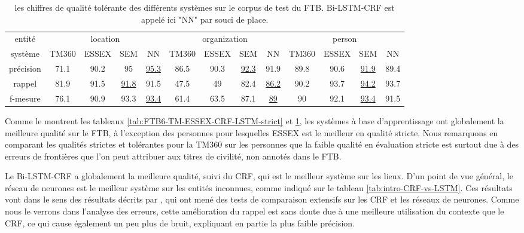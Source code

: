 \documentclass[12pt,a4paper,times,twoside,openright]{report}
\begin{document}
\begin{table}[ht!]
\centering
\scriptsize
\begin{tabular}{|c|cccc|cccc|cccc|}
\hline
entité    & \multicolumn{4}{c|}{location}                        & \multicolumn{4}{c|}{organization}                   & \multicolumn{4}{c|}{person} \\
système   & TM360 &  ESSEX & SEM              & NN               & TM360 & ESSEX & SEM              & NN               & TM360 & ESSEX & SEM              & NN \\
\hline
précision & 71.1  & 90.2   & 95               & \underline{95.3} & 86.5  & 90.3  & \underline{92.3} & 91.9             & 89.8 & 90.6   & \underline{91.9} & 89.4 \\
rappel    & 81.9  & 91.5   & \underline{91.8} & 91.5             & 47.5  & 49    & 82.4             & \underline{86.2} & 90.2 & 93.7   & \underline{94.2} & 93.7 \\
f-mesure  & 76.1  & 90.9   & 93.3             & \underline{93.4} & 61.4  & 63.5  & 87.1             & \underline{89}   & 90   & 92.1   & \underline{93.4} & 91.5 \\
\hline
\end{tabular}
\caption{les chiffres de qualité tolérante des différents systèmes sur le corpus de test du FTB. Bi-LSTM-CRF est appelé ici "NN" par souci de place.}
\label{tab:FTB6-TM-ESSEX-CRF-LSTM-tolerant}
\end{table}

Comme le montrent les tableaux \ref{tab:FTB6-TM-ESSEX-CRF-LSTM-strict} et \ref{tab:FTB6-TM-ESSEX-CRF-LSTM-tolerant}, les systèmes à base d'apprentissage ont globalement la meilleure qualité sur le FTB, à l'exception des personnes pour lesquelles ESSEX est le meilleur en qualité stricte. Nous remarquons en comparant les qualités strictes et tolérantes pour la TM360 sur les personnes que la faible qualité en évaluation stricte est surtout due à des erreurs de frontières que l'on peut attribuer aux titres de civilité, non annotés dans le FTB.

Le Bi-LSTM-CRF a globalement la meilleure qualité, suivi du CRF, qui est le meilleur système sur les lieux. D'un point de vue général, le réseau de neurones est le meilleur système sur les entités inconnues, comme indiqué sur le tableau \ref{tab:intro-CRF-vs-LSTM}. Ces résultats vont dans le sens des résultats décrits par \citet{augenstein2017generalisation}, qui ont mené des tests de comparaison extensifs sur les CRF et les réseaux de neurones. Comme nous le verrons dans l'analyse des erreurs, cette amélioration du rappel est sans doute due à une meilleure utilisation du contexte que le CRF, ce qui cause également un peu plus de bruit, expliquant en partie la plus faible précision.
\end{document}
